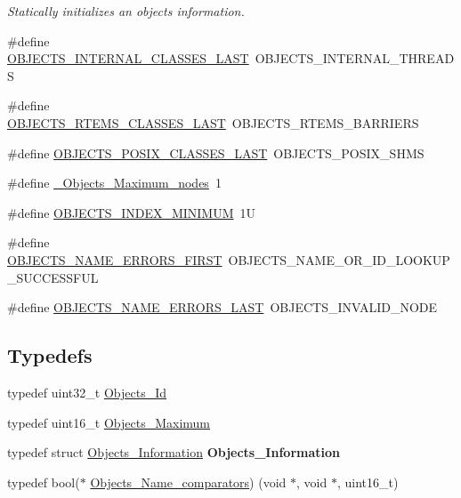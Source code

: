 \begin{DoxyCompactItemize}
\begin{DoxyCompactList}\small\item\em Statically initializes an objects information. \end{DoxyCompactList}\item 
\#define \mbox{\hyperlink{group__RTEMSScoreObject_gaf280fa4c34683a3dca79fcd3a4b6da5c}{O\+B\+J\+E\+C\+T\+S\+\_\+\+I\+N\+T\+E\+R\+N\+A\+L\+\_\+\+C\+L\+A\+S\+S\+E\+S\+\_\+\+L\+A\+ST}}~O\+B\+J\+E\+C\+T\+S\+\_\+\+I\+N\+T\+E\+R\+N\+A\+L\+\_\+\+T\+H\+R\+E\+A\+DS
\item 
\#define \mbox{\hyperlink{group__RTEMSScoreObject_ga8128102cbd1644eb3996319486398973}{O\+B\+J\+E\+C\+T\+S\+\_\+\+R\+T\+E\+M\+S\+\_\+\+C\+L\+A\+S\+S\+E\+S\+\_\+\+L\+A\+ST}}~O\+B\+J\+E\+C\+T\+S\+\_\+\+R\+T\+E\+M\+S\+\_\+\+B\+A\+R\+R\+I\+E\+RS
\item 
\#define \mbox{\hyperlink{group__RTEMSScoreObject_ga38a9b0ab40c5fad6bfb0d43bdea992df}{O\+B\+J\+E\+C\+T\+S\+\_\+\+P\+O\+S\+I\+X\+\_\+\+C\+L\+A\+S\+S\+E\+S\+\_\+\+L\+A\+ST}}~O\+B\+J\+E\+C\+T\+S\+\_\+\+P\+O\+S\+I\+X\+\_\+\+S\+H\+MS
\item 
\#define \mbox{\hyperlink{group__RTEMSScoreObject_ga926f1a08ed4b3780f90798a0f9d750af}{\+\_\+\+Objects\+\_\+\+Maximum\+\_\+nodes}}~1
\item 
\#define \mbox{\hyperlink{group__RTEMSScoreObject_ga862ae375ea2befa61f83ce6c1d1b5802}{O\+B\+J\+E\+C\+T\+S\+\_\+\+I\+N\+D\+E\+X\+\_\+\+M\+I\+N\+I\+M\+UM}}~1U
\item 
\#define \mbox{\hyperlink{group__RTEMSScoreObject_ga046df47371da1bd4f95bc63dcfea51c4}{O\+B\+J\+E\+C\+T\+S\+\_\+\+N\+A\+M\+E\+\_\+\+E\+R\+R\+O\+R\+S\+\_\+\+F\+I\+R\+ST}}~O\+B\+J\+E\+C\+T\+S\+\_\+\+N\+A\+M\+E\+\_\+\+O\+R\+\_\+\+I\+D\+\_\+\+L\+O\+O\+K\+U\+P\+\_\+\+S\+U\+C\+C\+E\+S\+S\+F\+UL
\item 
\#define \mbox{\hyperlink{group__RTEMSScoreObject_ga1452cd19bcd8b5e8a580729e854a1444}{O\+B\+J\+E\+C\+T\+S\+\_\+\+N\+A\+M\+E\+\_\+\+E\+R\+R\+O\+R\+S\+\_\+\+L\+A\+ST}}~O\+B\+J\+E\+C\+T\+S\+\_\+\+I\+N\+V\+A\+L\+I\+D\+\_\+\+N\+O\+DE
\end{DoxyCompactItemize}
\subsection*{Typedefs}
\begin{DoxyCompactItemize}
\item 
typedef uint32\+\_\+t \mbox{\hyperlink{group__RTEMSScoreObject_ga5821f52a51072941bdd603e542d0863e}{Objects\+\_\+\+Id}}
\item 
typedef uint16\+\_\+t \mbox{\hyperlink{group__RTEMSScoreObject_gaa2735357885ec7d7157c32f3f835f9ae}{Objects\+\_\+\+Maximum}}
\item 
\mbox{\label{group__RTEMSScoreObject_ga95b24faae8ee7200179571c6e710d50f}} 
typedef struct \mbox{\hyperlink{structObjects__Information}{Objects\+\_\+\+Information}} {\bfseries Objects\+\_\+\+Information}
\item 
typedef bool($\ast$ \mbox{\hyperlink{group__RTEMSScoreObject_ga611038b478f991746dee86b76eca513b}{Objects\+\_\+\+Name\+\_\+comparators}}) (void $\ast$, void $\ast$, uint16\+\_\+t)
\end{DoxyCompactItemize}
